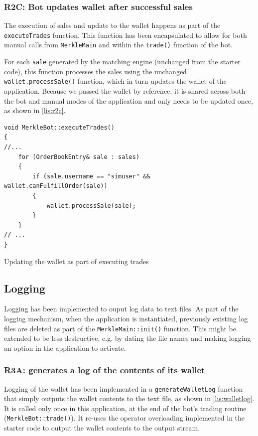 \subsubsection{R2C: Bot updates wallet after successful sales}
The execution of sales and update to the wallet happens as part of the \texttt{executeTrades} function. This function has been encapsulated to allow for both manual calls from \texttt{MerkleMain} and within the \texttt{trade()} function of the bot.

For each \texttt{sale} generated by the matching engine (unchanged from the starter code), this function processes the sales using the unchanged \texttt{wallet.processSale()} function, which in turn updates the wallet of the application. Because we passed the wallet by reference, it is shared across both the bot and manual modes of the application and only needs to be updated once, as shown in \autoref{lis:r2c}.

\begin{listing}[H]
	\begin{verbatim}
void MerkleBot::executeTrades() 
{
//...
	for (OrderBookEntry& sale : sales)
	{
		if (sale.username == "simuser" && wallet.canFulfillOrder(sale))
		{
			wallet.processSale(sale);
		}
	}
// ...
}
	\end{verbatim}

	\caption{Updating the wallet as part of executing trades}
	\label{lis:r2c}
\end{listing}

\subsection{Logging}
Logging has been implemented to ouput log data to text files. As part of the logging mechanism, when the application is instantiated, previously existing log files are deleted as part of the \texttt{MerkleMain::init()} function. This might be extended to be less destructive, e.g. by dating the file names and making logging an option in the application to activate.

\subsubsection{R3A: generates a log of the contents of its wallet}
Logging of the wallet has been implemented in a \texttt{generateWalletLog} function that simply outputs the wallet contents to the text file, as shown in \autoref{lis:walletlog}. It is called only once in this application, at the end of the bot's trading routine (\texttt{MerkleBot::trade()}). It re-uses the operator overloading implemented in the starter code to output the wallet contents to the output stream.

